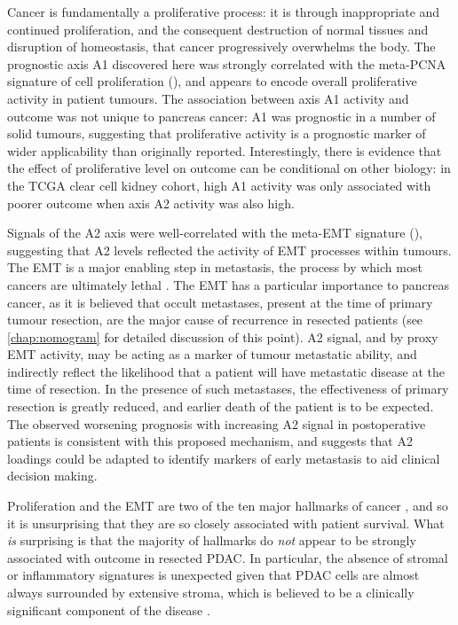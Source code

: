 \documentclass[dissertation.tex]{subfiles}
\begin{document}
Cancer is fundamentally a proliferative process: it is through inappropriate and continued proliferation, and the consequent destruction of normal tissues and disruption of homeostasis, that cancer progressively overwhelms the body.  The prognostic axis A1 discovered here was strongly correlated with the meta-PCNA signature of cell proliferation \cite{Venet2011} (), and appears to encode overall proliferative activity in patient tumours.  The association between axis A1 activity and outcome was not unique to pancreas cancer: A1 was prognostic in a number of solid tumours, suggesting that proliferative activity is a prognostic marker of wider applicability than originally reported.  Interestingly, there is evidence that the effect of proliferative level on outcome can be conditional on other biology: in the \gls{TCGA} clear cell kidney cohort, high A1 activity was only associated with poorer outcome when axis A2 activity was also high.

Signals of the A2 axis were well-correlated with the meta-EMT signature \cite{Groger2012} (), suggesting that A2 levels reflected the activity of \gls{EMT} processes within tumours.  The \gls{EMT} is a major enabling step in metastasis, the process by which most cancers are ultimately lethal \cite{Talmadge2010}.  The \gls{EMT} has a particular importance to pancreas cancer, as it is believed that occult metastases, present at the time of primary tumour resection, are the major cause of recurrence in resected patients (see \cref{chap:nomogram} for detailed discussion of this point).  A2 signal, and by proxy \gls{EMT} activity, may be acting as a marker of tumour metastatic ability, and indirectly reflect the likelihood that a patient will have metastatic disease at the time of resection.  In the presence of such metastases, the effectiveness of primary resection is greatly reduced, and earlier death of the patient is to be expected.  The observed worsening prognosis with increasing A2 signal in postoperative patients is consistent with this proposed mechanism, and suggests that A2 loadings could be adapted to identify markers of early metastasis to aid clinical decision making.  

Proliferation and the \gls{EMT} are two of the ten major hallmarks of cancer \cite{Hanahan2011}, and so it is unsurprising that they are so closely associated with patient survival.  What \emph{is} surprising is that the majority of hallmarks do \emph{not} appear to be strongly associated with outcome in resected \gls{PDAC}.  In particular, the absence of stromal or inflammatory signatures is unexpected given that \gls{PDAC} cells are almost always surrounded by extensive stroma, which is believed to be a clinically significant component of the disease \cite{Luo2012}.
\end{document}
